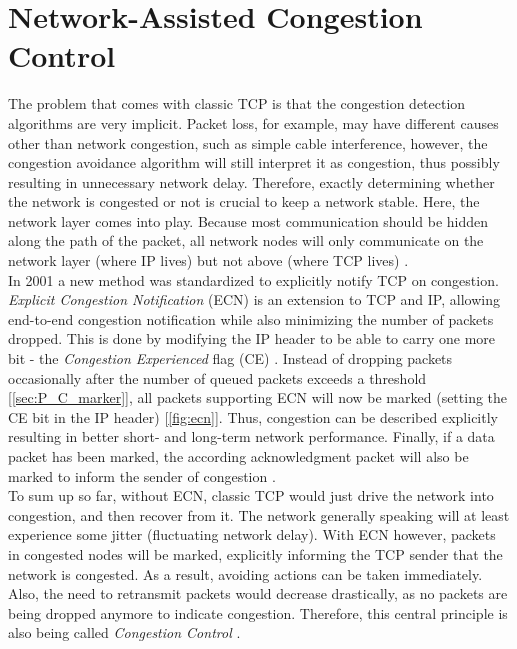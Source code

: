 \documentclass[a4paper,conference]{IEEEtran}
\begin{document}
\section{Network-Assisted Congestion Control}
\label{sec:cc}
The problem that comes with classic TCP is that the congestion detection algorithms are very implicit. Packet loss, for example, may have different causes other than network congestion, such as simple cable interference, however, the congestion avoidance algorithm will still interpret it as congestion, thus possibly resulting in unnecessary network delay. Therefore, exactly determining whether the network is congested or not is crucial to keep a network stable. Here, the network layer comes into play. Because most communication should be hidden along the path of the packet, all network nodes will only communicate on the network layer (where IP lives) but not above (where TCP lives) \cite{ramakrishnan1999proposal}.\\
In 2001 a new method was standardized to explicitly notify TCP on congestion. \textit{Explicit Congestion Notification} (ECN) is an extension to TCP and IP, allowing end-to-end congestion notification while also minimizing the number of packets dropped. This is done by modifying the IP header to be able to carry one more bit - the \textit{Congestion Experienced} flag (CE) \cite{ramakrishnan1999proposal}. Instead of dropping packets occasionally after the number of queued packets exceeds a threshold [\autoref{sec:P_C_marker}], all packets supporting ECN will now be marked (setting the CE bit in the IP header) [\autoref{fig:ecn}]. Thus, congestion can be described explicitly resulting in better short- and long-term network performance. Finally, if a data packet has been marked, the according acknowledgment packet will also be marked to inform the sender of congestion \cite{ramakrishnan1999proposal,ramakrishnan2001addition,10.1145/205511.205512}.\\
To sum up so far, without ECN, classic TCP would just drive the network into congestion, and then recover from it. The network generally speaking will at least experience some jitter (fluctuating network delay). With ECN however, packets in congested nodes will be marked, explicitly informing the TCP sender that the network is congested. As a result, avoiding actions can be taken immediately. Also, the need to retransmit packets would decrease drastically, as no packets are being dropped anymore to indicate congestion. Therefore, this central principle is also being called \textit{Congestion Control} \cite{ramakrishnan1999proposal,ramakrishnan2001addition}.
\end{document}
